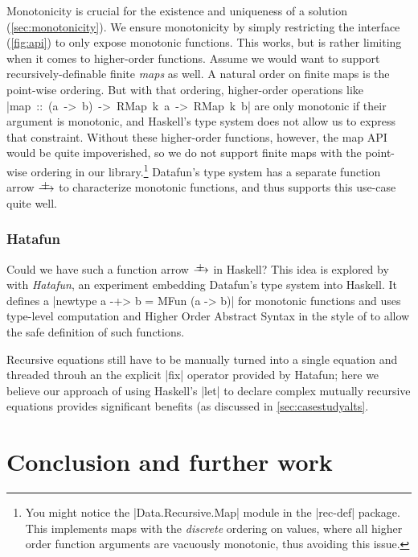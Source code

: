 \documentclass[manuscript,review,screen,acmsmall]{acmart}
\begin{document}
\newcommand{\mfun}{\xrightarrow{\raisebox{-3pt}[0pt][0pt]{+}}}

Monotonicity is crucial for the existence and uniqueness of a solution (\cref{sec:monotonicity}). We ensure monotonicity by simply restricting the interface (\cref{fig:api}) to only expose monotonic functions. This works, but is rather limiting when it comes to higher-order functions. Assume we would want to support recursively-definable finite \emph{maps} as well. A natural order on finite maps is the point-wise ordering. But with that ordering, higher-order operations like \mbox{|map :: (a -> b) -> RMap k a -> RMap k b|} are only monotonic if their argument is monotonic, and Haskell's type system does not allow us to express that constraint. Without these higher-order functions, however, the map API would be quite impoverished, so we do not support finite maps with the point-wise ordering in our library.\footnote{You might notice the |Data.Recursive.Map| module in the |rec-def| package. This implements maps with the \emph{discrete} ordering on values, where all higher order function arguments are vacuously monotonic, thus avoiding this issue.} Datafun's type system has a separate function arrow $\mfun$ to characterize monotonic functions, and thus supports this use-case quite well.


\subsubsection{Hatafun}

Could we have such a function arrow $\mfun$ in Haskell? This idea is explored by \citet{hatafun} with \emph{Hatafun}, an experiment embedding Datafun's type system into Haskell. It defines a |newtype a -+> b = MFun (a -> b)| for monotonic functions and uses type-level computation and Higher Order Abstract Syntax in the style of \citet{polakow} to allow the safe definition of such functions.

Recursive equations still have to be manually turned into a single equation and threaded throuh an the explicit |fix| operator provided by Hatafun; here we believe our approach of using Haskell's |let| to declare complex mutually recursive equations provides significant benefits (as discussed in \cref{sec:casestudyalts}.

\section{Conclusion and further work}
\end{document}
